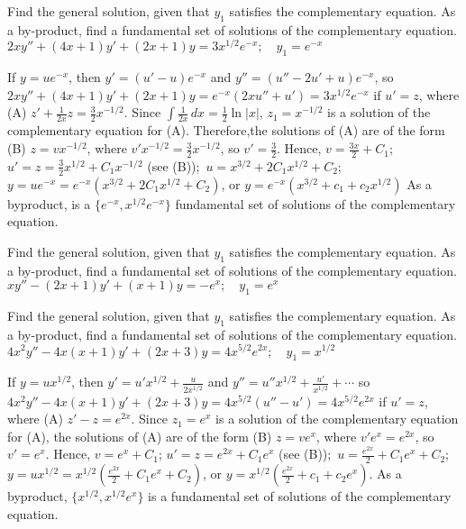\documentclass{ximera}
\begin{document}
\begin{problem}\label{exer:5.6.14}
Find the general solution,
given that $y_1$ satisfies the complementary equation. As a by-product,
find a fundamental set of solutions of the complementary equation. $2xy''+(4x+1)y'+(2x+1)y=3x^{1/2}e^{-x};  \quad y_1=e^{-x}$

\begin{solution}
    If $y=ue^{-x}$, then $y'=(u'-u)e^{-x}$ and $y''=(u''-2u'+u)e^{-x}$, so
$2xy''+(4x+1)y'+(2x+1)y=e^{-x}(2xu''+u')=3x^{1/2}e^{-x}$ if $u'=z$,
where (A) $z'+\frac{1}{2x}z=\frac{3}{2}x^{-1/2}$. Since $\int
\frac{1}{2x}\,dx=\frac{1}{2}\ln|x|$, $z_1=x^{-1/2}$ is a solution of
the complementary equation for (A). Therefore,the solutions of (A) are
of the form (B) $z=vx^{-1/2}$, where
$v'x^{-1/2}=\frac{3}{2}x^{-1/2}$, so $v'=\frac{3}{2}$. Hence,
$v=\frac{3x}{2}+C_1$;\ $u'=z=\frac{3}{2}x^{1/2}+C_1x^{-1/2}$ (see
(B));\ $u=x^{3/2}+2C_1x^{1/2}+C_2$;\;
$y=ue^{-x}=e^{-x}(x^{3/2}+2C_1x^{1/2}+C_2)$, or
$y=e^{-x}(x^{3/2}+c_1+c_2x^{1/2})$ As a byproduct, is a
$\{e^{-x},x^{1/2}e^{-x}\}$ fundamental set of solutions of the
complementary equation.
\end{solution}
\end{problem}

\begin{problem}\label{exer:5.6.15}
Find the general solution,
given that $y_1$ satisfies the complementary equation. As a by-product,
find a fundamental set of solutions of the complementary equation. $xy''-(2x+1)y'+(x+1)y=-e^x;  \quad y_1=e^x$
\end{problem}

\begin{problem}\label{exer:5.6.16}
Find the general solution,
given that $y_1$ satisfies the complementary equation. As a by-product,
find a fundamental set of solutions of the complementary equation. $4x^2y''-4x(x+1)y'+(2x+3)y=4x^{5/2}e^{2x};  \quad y_1=x^{1/2}$

\begin{solution}
    If $y=ux^{1/2}$, then $y'=u'x^{1/2}+\frac{u}{2x^{1/2}}$ and
$y''=u''x^{1/2}+\frac{u'}{ x^{1/2}}+\cdots$ so
$4x^2y''-4x(x+1)y'+(2x+3)y=4x^{5/2}(u''-u')=4x^{5/2}e^{2x}$ if $u'=z$,
where (A) $z'-z=e^{2x}$. Since $z_1=e^x$ is a solution of the
complementary equation for (A), the solutions of (A) are of the form
(B) $z=ve^x$, where $v'e^x=e^{2x}$, so $v'=e^x$. Hence, $v=e^x+C_1$;\;
$u'=z=e^{2x}+C_1e^x$ (see (B));\ $u=\frac{e^{2x}}{2}+C_1e^x+C_2$;\;
$y=ux^{1/2}=x^{1/2}\left(\frac{e^{2x}}{2}+C_1e^x+C_2\right)$, or
$y=x^{1/2}\left(\frac{e^{2x}}{2}+c_1+c_2e^x\right)$. As a
byproduct, $\{x^{1/2},x^{1/2}e^x\}$ is a fundamental set of solutions
of the complementary equation.
\end{solution}
\end{problem}
\end{document}
